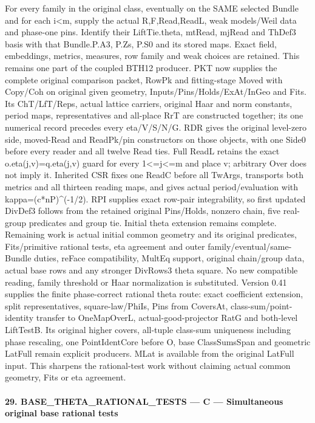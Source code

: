 \documentclass[11pt,a4paper]{article}
\numberwithin{equation}{section}
\theoremstyle{remark}\newtheorem{remark}[theorem]{Remark}
\begin{document}
For every family in the original class, eventually on the SAME selected Bundle and for each i<m, supply the actual R,F,Read,ReadL, weak models/Weil data and phase-one pins. Identify their LiftTie.theta, mtRead, mjRead and ThDef3 basis with that Bundle.P.A3, P.Zs, P.S0 and its stored maps. Exact field, embeddings, metrics, measures, row family and weak choices are retained. This remains one part of the coupled BTH12 producer. PKT now supplies the complete original comparison packet, RowPk and fitting-stage Moved with Copy/Coh on original given geometry, Inputs/Pins/Holds/ExAt/InGeo and Fits. Its ChT/LfT/Reps, actual lattice carriers, original Haar and norm constants, period maps, representatives and all-place RrT are constructed together; its one numerical record precedes every eta/V/S/N/G. RDR gives the original level-zero side, moved-Read and ReadPk/pin constructors on those objects, with one Side0 before every reader and all twelve Read ties. Full ReadL retains the exact o.eta(j,v)=q.eta(j,v) guard for every 1<=j<=m and place v; arbitrary Over does not imply it. Inherited CSR fixes one ReadC before all TwArgs, transports both metrics and all thirteen reading maps, and gives actual period/evaluation with kappa=(c*nP)\textasciicircum{}(-1/2). RPI supplies exact row-pair integrability, so first updated DivDef3 follows from the retained original Pins/Holds, nonzero chain, five real-group predicates and group tie. Initial theta extension remains complete. Remaining work is actual initial common geometry and its original predicates, Fits/primitive rational tests, eta agreement and outer family/eventual/same-Bundle duties, reFace compatibility, MultEq support, original chain/group data, actual base rows and any stronger DivRows3 theta square. No new compatible reading, family threshold or Haar normalization is substituted. Version 0.41 supplies the finite phase-correct rational theta route: exact coefficient extension, split representatives, square-law/PhiIs, Pins from CoversAt, class-sum/point-identity transfer to OneMapOverL, actual-good-projector RatG and both-level LiftTestB. Its original higher covers, all-tuple class-sum uniqueness including phase rescaling, one PointIdentCore before O, base ClassSumsSpan and geometric LatFull remain explicit producers. MLat is available from the original LatFull input. This sharpens the rational-test work without claiming actual common geometry, Fits or eta agreement.



\paragraph{29. BASE\_\allowbreak THETA\_\allowbreak RATIONAL\_\allowbreak TESTS — C — Simultaneous original base rational tests}
\end{document}
